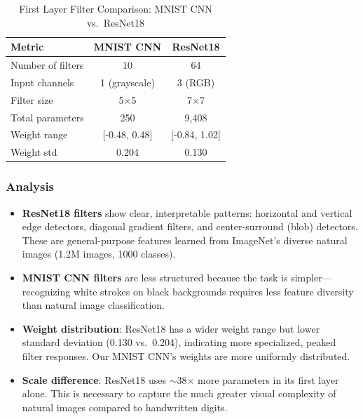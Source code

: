 \documentclass[11pt]{article}
\begin{document}
\begin{table}[H]
    \centering
    \caption{First Layer Filter Comparison: MNIST CNN vs.\ ResNet18}
    \vspace{0.1in}
    \begin{tabular}{lcc}
        \toprule
        \textbf{Metric} & \textbf{MNIST CNN} & \textbf{ResNet18} \\
        \midrule
        Number of filters & 10 & 64 \\
        Input channels & 1 (grayscale) & 3 (RGB) \\
        Filter size & 5$\times$5 & 7$\times$7 \\
        Total parameters & 250 & 9,408 \\
        Weight range & [-0.48, 0.48] & [-0.84, 1.02] \\
        Weight std & 0.204 & 0.130 \\
        \bottomrule
    \end{tabular}
\end{table}

\subsubsection{Analysis}

\begin{itemize}
    \item \textbf{ResNet18 filters} show clear, interpretable patterns: horizontal and vertical edge detectors, diagonal gradient filters, and center-surround (blob) detectors. These are general-purpose features learned from ImageNet's diverse natural images (1.2M images, 1000 classes).
    
    \item \textbf{MNIST CNN filters} are less structured because the task is simpler---recognizing white strokes on black backgrounds requires less feature diversity than natural image classification.
    
    \item \textbf{Weight distribution}: ResNet18 has a wider weight range but lower standard deviation (0.130 vs.\ 0.204), indicating more specialized, peaked filter responses. Our MNIST CNN's weights are more uniformly distributed.
    
    \item \textbf{Scale difference}: ResNet18 uses $\sim$38$\times$ more parameters in its first layer alone. This is necessary to capture the much greater visual complexity of natural images compared to handwritten digits.
\end{itemize}
\end{document}
